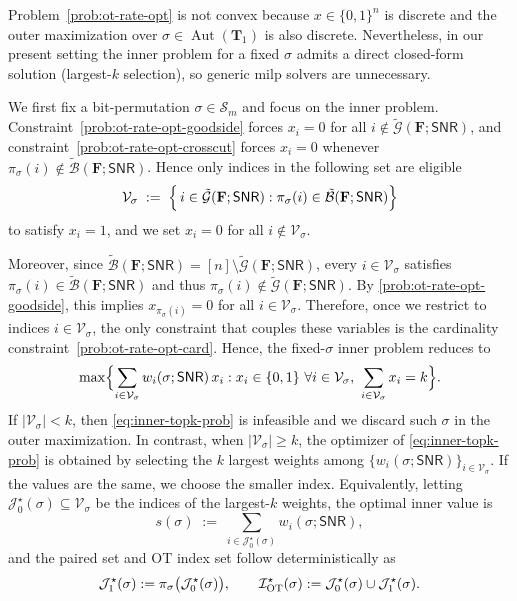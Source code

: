 \documentclass[onecolumn]{IEEEtran} %
\newcommand{\bF}{\mathbf F}
\newcommand{\1}{\mathbbm{1}}
\DeclareMathOperator{\Aut}{Aut}
\theoremstyle{boldremark}
\newcommand{\bT}{\mathbf{T}}
\begin{document}
Problem~\eqref{prob:ot-rate-opt} is not convex because $x\in\{0,1\}^{n}$ is discrete and the outer maximization
over $\sigma\in\Aut(\bT_1)$ is also discrete. Nevertheless, in our present setting the inner problem for a fixed
$\sigma$ admits a direct closed-form solution (largest-$k$ selection), so generic \gls{milp} solvers are unnecessary.

We first fix a bit-permutation $\sigma\in\mathcal{S}_m$
and focus on the inner problem. Constraint~\eqref{prob:ot-rate-opt-goodside} forces $x_i=0$ for all
$i\notin \tilde{\mathcal{G}}(\bF;\textsf{SNR})$, and constraint~\eqref{prob:ot-rate-opt-crosscut} forces $x_i=0$
whenever $\pi_\sigma(i)\notin \tilde{\mathcal{B}}(\bF;\textsf{SNR})$. Hence only indices in the following set are eligible
\begin{align}\label{eq:Vsig-def}
\mathcal{V}_\sigma
\;:=\;
\Bigl\{\, i\in \tilde{\mathcal{G}}(\bF;\textsf{SNR}) :
\pi_\sigma(i)\in \tilde{\mathcal{B}}(\bF;\textsf{SNR}) \Bigr\}
\end{align}
to satisfy $x_i=1$, and we set $x_i=0$ for all $i\notin\mathcal{V}_\sigma$.

Moreover, since $\tilde{\mathcal{B}}(\bF;\textsf{SNR})=[n]\setminus\tilde{\mathcal{G}}(\bF;\textsf{SNR})$,
every $i\in\mathcal{V}_\sigma$ satisfies $\pi_\sigma(i)\in\tilde{\mathcal{B}}(\bF;\textsf{SNR})$ and thus
$\pi_\sigma(i)\notin\tilde{\mathcal{G}}(\bF;\textsf{SNR})$. By \eqref{prob:ot-rate-opt-goodside},
this implies $x_{\pi_\sigma(i)}=0$ for all $i\in\mathcal V_\sigma$. Therefore, once we restrict to indices $i\in\mathcal{V}_\sigma$, the only constraint that couples these variables is the cardinality constraint~\eqref{prob:ot-rate-opt-card}. Hence, the fixed-$\sigma$ inner problem reduces to
\begin{align}\label{eq:inner-topk-prob}
\max\Bigl\{\sum_{i\in\mathcal{V}_\sigma} w_i(\sigma;\textsf{SNR})\,x_i :
x_i\in\{0,1\}\ \forall i\in\mathcal{V}_\sigma,\ \sum_{i\in\mathcal{V}_\sigma} x_i = k\Bigr\}.
\end{align}
If $|\mathcal{V}_\sigma|<k$, then \eqref{eq:inner-topk-prob} is infeasible and we discard such $\sigma$ in the outer
maximization. In contrast, when $|\mathcal{V}_\sigma|\ge k$, the optimizer of \eqref{eq:inner-topk-prob} is obtained by selecting the $k$ largest
weights among $\{w_i(\sigma;\textsf{SNR})\}_{i\in\mathcal{V}_\sigma}$. If the values are the same, we choose the smaller index.
Equivalently, letting $\mathcal{J}_0^\star(\sigma)\subseteq\mathcal{V}_\sigma$ be the indices of the largest-$k$ weights,
the optimal inner value is
\[
s(\sigma)\;:=\;\sum_{i\in\mathcal{J}_0^\star(\sigma)} w_i(\sigma;\textsf{SNR}),
\]
and the paired set and OT index set follow deterministically as
\[
\mathcal{J}_1^\star(\sigma):=\pi_\sigma\bigl(\mathcal{J}_0^\star(\sigma)\bigr),
\qquad
\mathcal{I}_{\rm OT}^\star(\sigma):=\mathcal{J}_0^\star(\sigma)\cup\mathcal{J}_1^\star(\sigma).
\]
\end{document}
